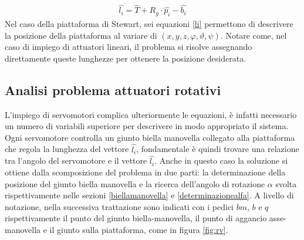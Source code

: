 \documentclass[12pt,twoside,openright]{article}
\begin{document}
\begin{align}\label{li}
\hat{l_i}=\hat{T}+R_g\cdot \hat{p_i}-\hat{b_i}
\end{align}
Nel caso della piattaforma di Stewart, sei equazioni \eqref{li} permettono di descrivere la posizione della piattaforma al variare di $(x,y,z,\varphi,\vartheta,\psi)$.
Notare come, nel caso di impiego di attuatori lineari, il problema si risolve assegnando direttamente queste lunghezze per ottenere la posizione desiderata. 

\subsection{Analisi problema attuatori rotativi}\label{rotation}
L'impiego di servomotori complica ulteriormente le equazioni, è infatti necessario un numero di variabili superiore per descrivere in modo appropriato il sistema. Ogni servomotore controlla un giunto biella manovella collegato alla piattaforma che regola la lunghezza del vettore $\hat{l_i}$, fondamentale è quindi trovare una relazione tra l'angolo del servomotore e il vettore $\hat{l_i}$. Anche in questo caso la soluzione si ottiene dalla scomposizione del problema in due parti: la determinazione della posizione del giunto biella manovella e la ricerca dell'angolo di rotazione $\alpha$ svolta rispettivamente nelle sezioni \ref{biellamanovella} e \ref{determinazionealfa}. A livello di notazione, nella successiva trattazione sono indicati con i pedici $bm$, $b$ e $q$ rispettivamente il punto del giunto biella-manovella, il punto di aggancio asse-manovella e il giunto sulla piattaforma, come in figura \ref{fig:rv}.
\end{document}
